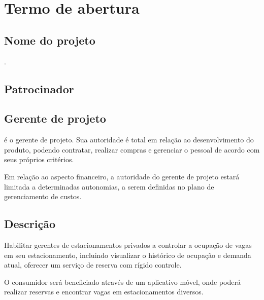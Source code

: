 
\chapter{Termo de abertura}

\section{Nome do projeto}

\projectName.

\section{Patrocinador}

\projectSponsorName


\section{Gerente de projeto}

\projectManagerName é o gerente de projeto. Sua autoridade é total em relação ao desenvolvimento do produto, podendo contratar, realizar compras e gerenciar o pessoal de acordo com seus próprios critérios.

Em relação ao aspecto financeiro, a autoridade do gerente de projeto estará limitada a determinadas autonomias, a serem definidas no plano de gerenciamento de custos.


\section{Descrição}

Habilitar gerentes de estacionamentos privados a controlar a ocupação de vagas em seu estacionamento, incluindo visualizar o histórico de ocupação e demanda atual, oferecer um serviço de reserva com rígido controle.

O consumidor será beneficiado através de um aplicativo móvel, onde poderá realizar reservas e encontrar vagas em estacionamentos diversos.

